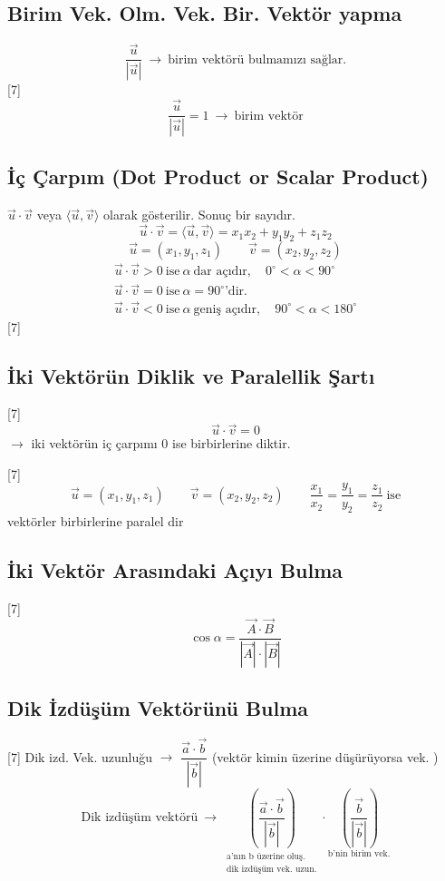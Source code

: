 \documentclass[11pt,a4paper]{article}
\begin{document}
\subsection{Birim Vek. Olm. Vek. Bir. Vektör yapma}
\[ \frac{\vec u}{|\vec u|}\ \to\ \text{birim vektörü bulmamızı sağlar.} \]
[7]
\[ \frac{\vec u}{|\vec u|}=1\ \to\ \text{birim vektör} \]

\subsection{İç Çarpım (Dot Product or Scalar Product)}
$\vec u\cdot\vec v$ veya $\langle\vec u,\vec v\rangle$ olarak gösterilir. Sonuç bir sayıdır.
\[ \vec u\cdot\vec v=\langle\vec u,\vec v\rangle=x_1x_2+y_1y_2+z_1z_2 \]
\[ \vec u=(x_1,y_1,z_1)\qquad \vec v=(x_2,y_2,z_2) \]
\begin{gather*}
\vec u\cdot\vec v>0\ \text{ise}\ \alpha\ \text{dar açıdır},\quad 0^\circ<\alpha<90^\circ\\
\vec u\cdot\vec v=0\ \text{ise}\ \alpha=90^\circ\text{'dir.}\\
\vec u\cdot\vec v<0\ \text{ise}\ \alpha\ \text{geniş açıdır},\quad 90^\circ<\alpha<180^\circ
\end{gather*}
[7]

\subsection{İki Vektörün Diklik ve Paralellik Şartı}
[7]
\[ \vec u\cdot\vec v=0 \]
$\to$ iki vektörün iç çarpımı 0 ise birbirlerine diktir.

[7]
\[ \vec u=(x_1,y_1,z_1)\qquad \vec v=(x_2,y_2,z_2)\qquad \frac{x_1}{x_2}=\frac{y_1}{y_2}=\frac{z_1}{z_2}\ \text{ise} \]
vektörler birbirlerine paralel dir

\subsection{İki Vektör Arasındaki Açıyı Bulma}
[7]
\[ \cos\alpha=\frac{\vec A\cdot\vec B}{|\vec A|\cdot|\vec B|} \]

\subsection{Dik İzdüşüm Vektörünü Bulma}
[7]
Dik izd. Vek. uzunluğu $\to$ $\dfrac{\vec a\cdot\vec b}{|\vec b|}$ \quad (vektör kimin üzerine düşürüyorsa vek. )
\[ \text{Dik izdüşüm vektörü}\ \to\ \underset{\substack{\text{a'nın b üzerine oluş.}\\ \text{dik izdüşüm vek. uzun.}}}{\left(\frac{\vec a\cdot\vec b}{|\vec b|}\right)}\cdot\underset{\text{b'nin birim vek.}}{\left(\frac{\vec b}{|\vec b|}\right)} \]
\end{document}
